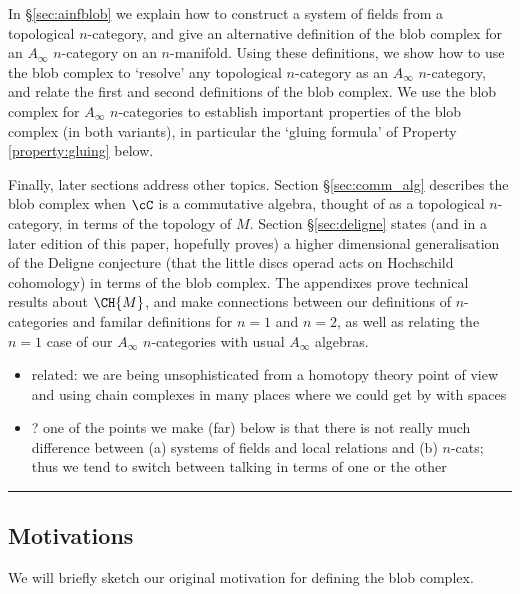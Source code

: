 In  \S \ref{sec:ainfblob} we explain how to construct a system of fields from a topological $n$-category, and give an alternative definition of the blob complex for an $A_\infty$ $n$-category on an $n$-manifold. Using these definitions, we show how to use the blob complex to `resolve' any topological $n$-category as an $A_\infty$ $n$-category, and relate the first and second definitions of the blob complex. We use the blob complex for $A_\infty$ $n$-categories to establish important properties of the blob complex (in both variants), in particular the `gluing formula' of Property \ref{property:gluing} below.


Finally, later sections address other topics. Section \S \ref{sec:comm_alg} describes the blob complex when $\cC$ is a commutative algebra, thought of as a topological $n$-category, in terms of the topology of $M$. Section \S \ref{sec:deligne} states (and in a later edition of this paper, hopefully proves) a higher dimensional generalisation of the Deligne conjecture (that the little discs operad acts on Hochschild cohomology) in terms of the blob complex. The appendixes prove technical results about $\CH{M}$, and make connections between our definitions of $n$-categories and familar definitions for $n=1$ and $n=2$, as well as relating the $n=1$ case of our $A_\infty$ $n$-categories with usual $A_\infty$ algebras.


\begin{itemize}
\item related: we are being unsophisticated from a homotopy theory point of
view and using chain complexes in many places where we could get by with spaces
\item ? one of the points we make (far) below is that there is not really much
difference between (a) systems of fields and local relations and (b) $n$-cats;
thus we tend to switch between talking in terms of one or the other
\end{itemize}

\medskip\hrule\medskip

\subsection{Motivations}
\label{sec:motivations}

We will briefly sketch our original motivation for defining the blob complex.

